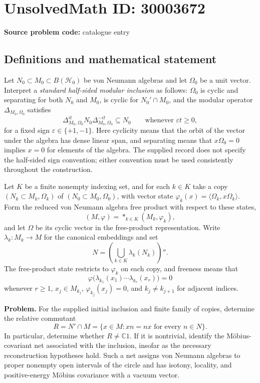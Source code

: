 \documentclass[11pt]{article}
\newcommand{\C}{\mathbb{C}}
\begin{document}
\section*{UnsolvedMath ID: 30003672}
\textbf{Source problem code:} catalogue entry
\subsection{Definitions and mathematical statement}
Let \(N_0\subset M_0\subset B(\mathcal H_0)\) be von Neumann algebras and let \(\Omega_0\) be a unit vector. Interpret a \emph{standard half-sided modular inclusion} as follows: \(\Omega_0\) is cyclic and separating for both \(N_0\) and \(M_0\), is cyclic for \(N_0'\cap M_0\), and the modular operator \(\Delta_{M_0,\Omega_0}\) satisfies
\[
\Delta_{M_0,\Omega_0}^{it}N_0\Delta_{M_0,\Omega_0}^{-it}\subseteq N_0
\qquad\text{whenever }\varepsilon t\geq 0,
\]
for a fixed sign \(\varepsilon\in\{+1,-1\}\). Here cyclicity means that the orbit of the vector under the algebra has dense linear span, and separating means that \(x\Omega_0=0\) implies \(x=0\) for elements of the algebra. The supplied record does not specify the half-sided sign convention; either convention must be used consistently throughout the construction.

Let \(K\) be a finite nonempty indexing set, and for each \(k\in K\) take a copy \((N_k\subset M_k,\Omega_k)\) of \((N_0\subset M_0,\Omega_0)\), with vector state \(\varphi_k(x)=\langle\Omega_k,x\Omega_k\rangle\). Form the reduced von Neumann algebra free product with respect to these states,
\[
(M,\varphi)=\mathop{*}_{k\in K}(M_k,\varphi_k),
\]
and let \(\Omega\) be its cyclic vector in the free-product representation. Write \(\lambda_k:M_k\to M\) for the canonical embeddings and set
\[
N=\left(\bigcup_{k\in K}\lambda_k(N_k)\right)''.
\]
The free-product state restricts to \(\varphi_k\) on each copy, and freeness means that
\[
\varphi\bigl(\lambda_{k_1}(x_1)\cdots\lambda_{k_r}(x_r)\bigr)=0
\]
whenever \(r\geq1\), \(x_j\in M_{k_j}\), \(\varphi_{k_j}(x_j)=0\), and \(k_j\ne k_{j+1}\) for adjacent indices.

\textbf{Problem.} For the supplied initial inclusion and finite family of copies, determine the relative commutant
\[
R=N'\cap M=\{x\in M: xn=nx\text{ for every }n\in N\}.
\]
In particular, determine whether \(R\ne\C1\). If it is nontrivial, identify the M\"obius-covariant net associated with the inclusion, insofar as the necessary reconstruction hypotheses hold. Such a net assigns von Neumann algebras to proper nonempty open intervals of the circle and has isotony, locality, and positive-energy M\"obius covariance with a vacuum vector.
\end{document}
